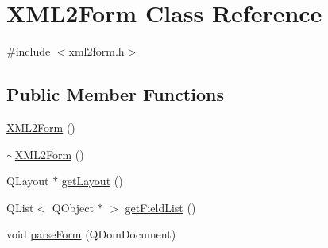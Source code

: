 \hypertarget{classXML2Form}{
\section{XML2Form Class Reference}
\label{classXML2Form}
}


{\ttfamily \#include $<$xml2form.h$>$}

\subsection*{Public Member Functions}
\begin{DoxyCompactItemize}
\item 
\hyperlink{classXML2Form_aea85912c9f4c7e61406086464fdcb076}{XML2Form} ()
\item 
\hyperlink{classXML2Form_a016742be563e446478aa39682db1f816}{$\sim$XML2Form} ()
\item 
QLayout $\ast$ \hyperlink{classXML2Form_ac6eeef2926b8b2d82d077d1101ca364f}{getLayout} ()
\item 
QList$<$ QObject $\ast$ $>$ \hyperlink{classXML2Form_ac35dbcdb7c719906f3de9143d29bdf80}{getFieldList} ()
\item 
void \hyperlink{classXML2Form_acf926f156b8bbc9016bb271baaa9c491}{parseForm} (QDomDocument)
\end{DoxyCompactItemize}

